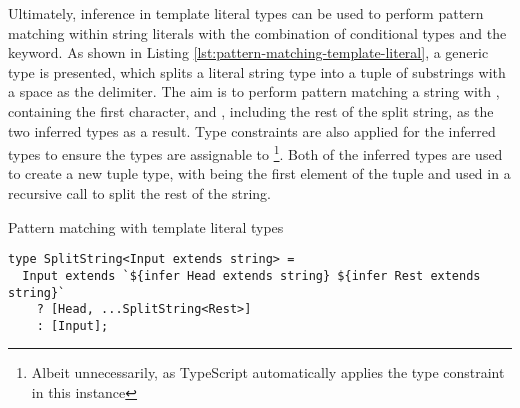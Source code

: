 Ultimately, inference in template literal types can be used to perform pattern matching within string literals with the combination of conditional types and the  keyword. As shown in Listing \ref{lst:pattern-matching-template-literal}, a generic type  is presented, which splits a literal string type into a tuple of substrings with a space as the delimiter. The aim is to perform pattern matching a string with , containing the first character, and , including the rest of the split string, as the two inferred types as a result. Type constraints are also applied for the inferred types to ensure the types are assignable to \footnote{Albeit unnecessarily, as TypeScript automatically applies the  type constraint in this instance}. Both of the inferred types are used to create a new tuple type, with  being the first element of the tuple and  used in a recursive call to split the rest of the string.

\begin{listing}[ht]
  \caption{Pattern matching with template literal types}\label{lst:pattern-matching-template-literal}
  \begin{verbatim}
type SplitString<Input extends string> = 
  Input extends `${infer Head extends string} ${infer Rest extends string}`
    ? [Head, ...SplitString<Rest>]
    : [Input];
\end{verbatim}
\end{listing}
